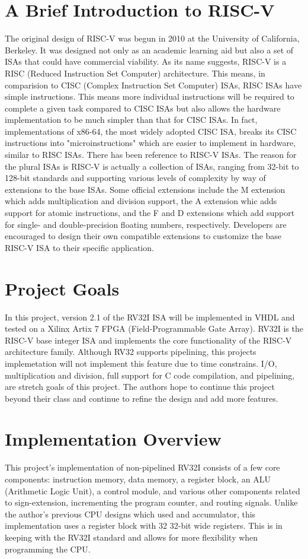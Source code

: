 \documentclass[lettersize,journal]{IEEEtran}
\begin{document}
\section{A Brief Introduction to RISC-V}
\noindent The original design of RISC-V was begun in 2010 at the University of California, Berkeley. It was designed not only as an academic learning aid but also a set of ISAs that could have commercial viability. As its name suggests, RISC-V is a RISC (Reduced Instruction Set Computer) architecture. This means, in comparision to CISC (Complex Instruction Set Computer) ISAs, RISC ISAs have simple instructions. This means more individual instructions will be required to complete a given task compared to CISC ISAs but also allows the hardware implementation to be much simpler than that for CISC ISAs. In fact, implementations of x86-64, the most widely adopted CISC ISA, breaks its CISC instructions into "microinstructions" which are easier to implement in hardware, similar to RISC ISAs.
There has been reference to RISC-V ISAs. The reason for the plural ISAs is RISC-V is actually a collection of ISAs, ranging from 32-bit to 128-bit standards and supporting various levels of complexity by way of extensions to the base ISAs. Some official extensions include the M extension which adds multiplication and division support, the A extension whic adds support for atomic instructions, and the F and D extensions which add support for single- and double-precision floating numbers, respectively. Developers are encouraged to design their own compatible extensions to customize the base RISC-V ISA to their specific application. 

\section{Project Goals}
\noindent In this project, version 2.1 of the RV32I ISA will be implemented in VHDL and tested on a Xilinx Artix 7 FPGA (Field-Programmable Gate Array). RV32I is the RISC-V base integer ISA and implements the core functionality of the RISC-V architecture family. Although RV32 supports pipelining, this projects implemetation will not implement this feature due to time constrains. I/O, multiplication and division, full support for C code compilation, and pipelining, are stretch goals of this project. The authors hope to continue this project beyond their class and continue to refine the design and add more features.
 
\section{Implementation Overview}
\noindent This project's implementation of non-pipelined RV32I consists of a few core components: instruction memory, data memory, a register block, an ALU (Arithmetic Logic Unit), a control module, and various other components related to sign-extension, incrementing the program counter, and routing signals. Unlike the author's previous CPU designs which used and accumulator, this implementation uses a register block with 32 32-bit wide registers. This is in keeping with the RV32I standard and allows for more flexibility when programming the CPU.
\end{document}
